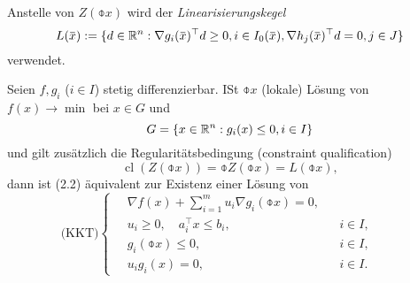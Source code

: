 Anstelle von $Z(\obar{x})$ wird der \emph{Linearisierungskegel}
\[ L( \obar{x} ) := \{ d \in \real^n : \nabla g_i(\obar{x})^\top d \ge 0, i \in
  I_0(\obar{x}), \nabla h_j(\obar{x})^\top d = 0, j \in J \} \]
verwendet.

\clearpage

\begin{thm} %
  Seien $f,g_i$ ($i \in I$) stetig differenzierbar. ISt $\obar{x}$ (lokale)
  Lösung von $f(x) \to  \min$ bei $x \in G$ und
  \[ G = \{ x \in \mathbb{R}^n : g_i(x) \le 0, i \in I \} \]
  und gilt zusätzlich die Regularitätsbedingung (constraint qualification)
  \[ \tag{CQ} \operatorname{cl}(Z(\obar{x})) = \obar{Z(\obar{x})} =
    L(\obar{x}), \]
  dann ist (2.2) äquivalent zur Existenz einer Lösung von
  \begin{equation} %
    \text{(KKT)} \left\{ \quad \begin{aligned} 
        \nabla f(x) + \sum_{i =1}^m u_i \nabla g_i(\obar{x}) = 0, & \\
        u_i \ge 0, \quad a_i^\top x \le b_i, & &i \in I, \\
        g_i(\obar{x}) \le 0, & &i \in I, \\
        u_i g_i(x) = 0, & &i \in I.
      \end{aligned} \qquad \right.
  \end{equation}
\end{thm}
